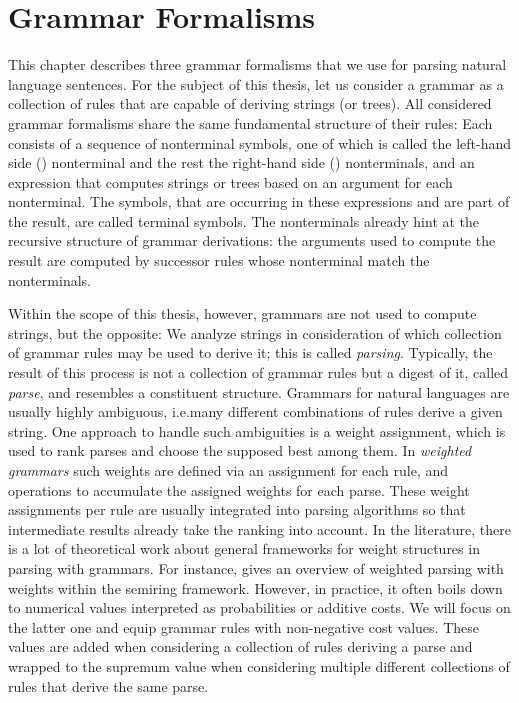 \documentclass[../document.tex]{subfiles}
\begin{document}
    \chapter{Grammar Formalisms}\label{sec:grammars}
    This chapter describes three grammar formalisms that we use for parsing natural language sentences.
    For the subject of this thesis, let us consider a grammar as a collection of rules that are capable of deriving strings (or trees).
    All considered grammar formalisms share the same fundamental structure of their rules:
        Each consists of a sequence of nonterminal symbols, one of which is called the left-hand side () nonterminal and the rest the right-hand side () nonterminals, and an expression that computes strings or trees based on an argument for each  nonterminal.
        The symbols, that are occurring in these expressions and are part of the result, are called terminal symbols.
    The nonterminals already hint at the recursive structure of grammar derivations: the arguments used to compute the result are computed by successor rules whose  nonterminal match the  nonterminals.

    Within the scope of this thesis, however, grammars are not used to compute strings, but the opposite:
        We analyze strings in consideration of which collection of grammar rules may be used to derive it; this is called \emph{parsing}.
    Typically, the result of this process is not a collection of grammar rules but a digest of it, called \emph{parse}, and resembles a constituent structure.
    Grammars for natural languages are usually highly ambiguous, i.e.\@ many different combinations of rules derive a given string.
    One approach to handle such ambiguities is a weight assignment, which is used to rank parses and choose the supposed best among them.
    In \emph{weighted grammars} such weights are defined via an assignment for each rule, and operations to accumulate the assigned weights for each parse.
    These weight assignments per rule are usually integrated into parsing algorithms so that intermediate results already take the ranking into account.
    In the literature, there is a lot of theoretical work about general frameworks for weight structures in parsing with grammars.
    For instance, \citet{Goodman} gives an overview of weighted parsing with weights within the semiring framework.
    However, in practice, it often boils down to numerical values interpreted as probabilities or additive costs.
    We will focus on the latter one and equip grammar rules with non-negative cost values.
    These values are added when considering a collection of rules deriving a parse and wrapped to the supremum value when considering multiple different collections of rules that derive the same parse.
\end{document}
